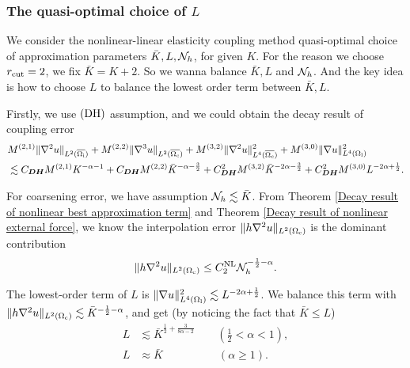\subsubsection{The quasi-optimal choice of $L$}
\label{sec: choice_of_L_cg}
We consider the nonlinear-linear elasticity coupling method quasi-optimal choice of approximation parameters $ \bar{K}, L, \mathcal{N}_{h}$, for given $K$. For the reason we choose $r_{{\rm cut}}=2$, we fix $\bar{K}=K+2$. So we wanna balance $\bar{K}, L$ and $\mathcal{N}_{h}$. And the key idea is how to choose $L$ to balance the lowest  order term between $\bar{K},L$.

Firstly, we use $\textbf{\rm (DH)}$ assumption, and we could obtain the decay result of coupling error
\begin{equation*}
	\begin{split}
		&M^{(2,1)}\Vert \nabla^{2} u\Vert_{L^{2}(\overline{\Omega_{{\rm i}}})} +M^{(2,2)}\Vert \nabla^{3}u \Vert_{L^{2}(\overline{\Omega_{{\rm c}}})}+M^{(3,2)}\Vert \nabla^{2}u \Vert^{2}_{L^{4}(\overline{\Omega_{{\rm c}}})} + M^{(3,0)}\Vert \nabla u \Vert^{2}_{L^{4}(\Omega_{{\rm l}})}\\
		&\lesssim C_{\bm{DH}} M^{(2,1)}K^{-\alpha -1}+C_{\bm{DH}} M^{(2,2)}\bar{K}^{-\alpha-\frac{3}{2}} +C_{\bm{DH}}^{2}M^{(3,2)}\bar{K}^{-2\alpha -\frac{3}{2}}+C_{\bm{DH}}^{2}M^{(3,0)}L^{-2\alpha+\frac{1}{2}} .
	\end{split}
\end{equation*}

For coarsening error, we have assumption $\mathcal{N}_{h} \lesssim \bar{K}$. From Theorem \ref{Decay result of nonlinear best approximation term} and Theorem \ref{Decay result of nonlinear external force}, we know the interpolation error $\Vert h\nabla^{2}u\Vert_{L^{2}(\Omega_{{\rm c}})}$ is the dominant contribution
\begin{equation*}
	\Vert h\nabla^{2} u\Vert_{L^{2}(\Omega_{{\rm c}})} \le C_{2}^{\text{NL}} \mathcal{N}_{h}^{-\frac{1}{2}-\alpha}.
\end{equation*}

The lowest-order term of $L$ is $\Vert \nabla u \Vert^{2}_{L^{4}(\Omega_{{\rm l}})} \lesssim L^{-2\alpha+\frac{1}{2}}$. We balance this term with $	\Vert h\nabla^{2} u\Vert_{L^{2}(\Omega_{{\rm c}})} \lesssim \bar{K}^{-\frac{1}{2}-\alpha}$, and get (by noticing the fact that $\bar{K}\le L$)
\begin{align}
	L &\lesssim \bar{K}^{\frac{1}{2}+\frac{3}{8\alpha-2}} \qquad (\frac{1}{2}<\alpha<1) \label{Balance of L CG 1},\\
	L &\approx \bar{K} \qquad \qquad \quad (\alpha \ge 1)\label{Balance of L CG 2}.
\end{align}




